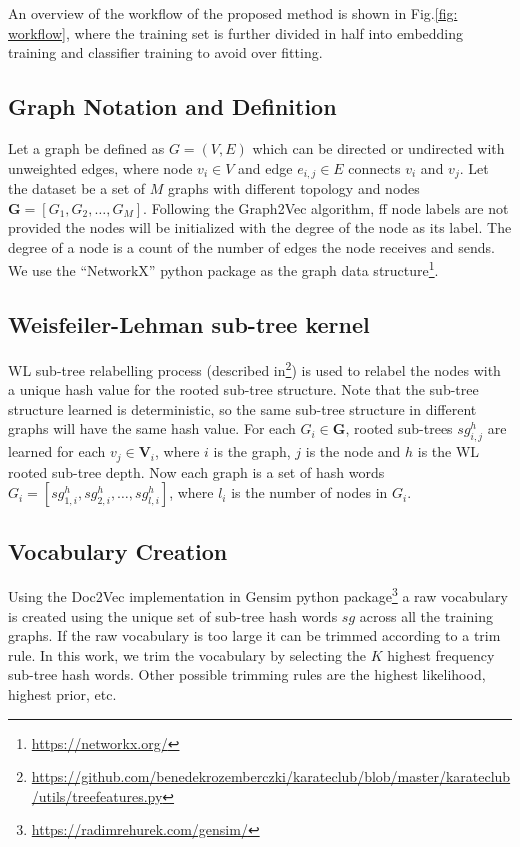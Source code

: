 An overview of the workflow of the proposed method is shown in Fig.\ref{fig: workflow}, where the training set is further divided in half into embedding training and classifier training to avoid over fitting.

\subsection{Graph Notation and Definition}
Let a graph be defined as $G = (V, E)$ which can be directed or undirected with unweighted edges, where node $v_i \in V$ and edge $e_{i,j} \in E$ connects $v_i$ and $v_j$. Let the dataset be a set of $M$ graphs with different topology and nodes $\mathbf{G} = [G_1, G_2, \dots, G_M]$. Following the Graph2Vec algorithm, ff node labels are not provided the nodes will be initialized with the degree of the node as its label. The degree of a node is a count of the number of edges the node receives and sends. We use the ``NetworkX'' python package as the graph data structure\footnote{\url{https://networkx.org/}}.

\subsection{Weisfeiler-Lehman sub-tree  kernel}
WL sub-tree relabelling process (described in\cite{shervashidze2011weisfeiler}\footnote{\url{https://github.com/benedekrozemberczki/karateclub/blob/master/karateclub/utils/treefeatures.py}}) is used to relabel the nodes with a unique hash value for the rooted sub-tree structure. Note that the sub-tree structure learned is deterministic, so the same sub-tree structure in different graphs will have the same hash value. For each $G_i \in \mathbf{G}$, rooted sub-trees $sg_{i,j}^h$ are learned for each $v_j \in \mathbf{V}_i$, where $i$ is the graph, $j$ is the node and $h$ is the WL rooted sub-tree depth. Now each graph is a set of hash words $G_i = [sg_{1,i}^h, sg_{2,i}^h, \dots, sg_{l,i}^h]$, where $l_i$ is the number of nodes in $G_i$.

\subsection{Vocabulary Creation}
Using the Doc2Vec implementation in Gensim python package\footnote{\url{https://radimrehurek.com/gensim/}} a raw vocabulary is created using the unique set of sub-tree hash words $sg$ across all the training graphs\cite{Le2014}. If the raw vocabulary is too large it can be trimmed according to a trim rule. In this work, we trim the vocabulary by selecting the $K$ highest frequency sub-tree hash words. Other possible trimming rules are the highest likelihood, highest prior, etc. 

